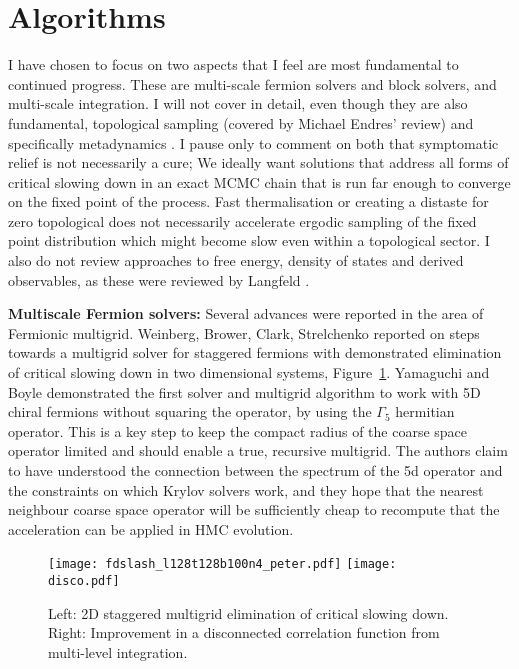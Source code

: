 \documentclass{PoS}
\begin{document}
\section{Algorithms}

I have chosen to focus on two aspects that I feel are most fundamental to continued progress.
These are multi-scale fermion solvers and block solvers, and multi-scale integration.
I will not cover in detail, even though they are also fundamental,
topological sampling (covered by Michael Endres' review) and specifically metadynamics
\cite{sanfilippo}. 
I pause only to comment on both that symptomatic relief is not necessarily a cure;
We ideally want solutions that address all forms of critical slowing down in an exact MCMC chain that is run
far enough to converge on the fixed point of the process. Fast thermalisation or creating a distaste for zero
topological does not necessarily accelerate ergodic sampling of the fixed point distribution which might
become slow even within a topological sector.
I also do not review approaches to free energy, density of states and derived observables, as these were reviewed by Langfeld
\cite{Langfeld,Nada,Pellegrini, Lucini}.

{\bf Multiscale Fermion solvers:}
Several advances were reported in the area of Fermionic multigrid.
Weinberg, Brower, Clark, Strelchenko reported on steps towards a multigrid
solver for staggered fermions with demonstrated elimination of critical slowing down
in two dimensional systems\cite{weinberg}, Figure~\ref{fig:mgrid}. Yamaguchi and Boyle\cite{yamaguchi}
demonstrated the first solver and multigrid algorithm to work with 5D chiral fermions without
squaring the operator, by using the $\Gamma_5$ hermitian operator. This is a key step to keep the compact radius of the coarse space operator
limited and should enable a true, recursive multigrid. The authors claim to have understood the
connection between the spectrum of the 5d operator and the constraints on which Krylov solvers work,
and they hope that the nearest neighbour coarse space
operator will be sufficiently cheap to recompute that the acceleration can be applied in HMC evolution.

\begin{figure}[hbt]
\texttt{[image: fdslash\_l128t128b100n4\_peter.pdf]}
\texttt{[image: disco.pdf]}
\caption{\label{fig:mgrid} Left: 2D staggered multigrid elimination of critical slowing down.
Right: Improvement in a disconnected correlation function from multi-level integration.}
\end{figure}
\end{document}
